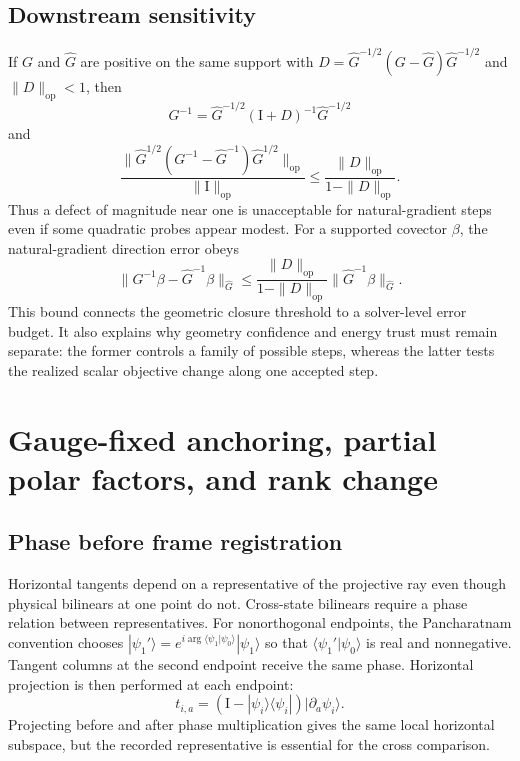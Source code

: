 \documentclass[10pt,twocolumn]{article}
\theoremstyle{definition}
\theoremstyle{remark}
\newcommand{\Id}{\mathrm I}
\newcommand{\op}{\mathrm{op}}
\begin{document}
\subsection{Downstream sensitivity}

If $G$ and $\widehat G$ are positive on the same support with
$D=\widehat G^{-1/2}(G-\widehat G)\widehat G^{-1/2}$ and
$\|D\|_{\op}<1$, then
\begin{equation}
 G^{-1}
 =\widehat G^{-1/2}(\Id+D)^{-1}\widehat G^{-1/2}
 \label{eq:appinverseidentity}
\end{equation}
and
\begin{equation}
 \frac{\|\widehat G^{1/2}(G^{-1}-\widehat G^{-1})
 \widehat G^{1/2}\|_{\op}}
 {\|\Id\|_{\op}}
 \le\frac{\|D\|_{\op}}{1-\|D\|_{\op}} .
 \label{eq:appinversebound}
\end{equation}
Thus a defect of magnitude near one is unacceptable for natural-gradient
steps even if some quadratic probes appear modest.  For a supported covector
$\beta$, the natural-gradient direction error obeys
\begin{equation}
 \|G^{-1}\beta-\widehat G^{-1}\beta\|_{\widehat G}
 \le
 \frac{\|D\|_{\op}}{1-\|D\|_{\op}}
 \|\widehat G^{-1}\beta\|_{\widehat G}.
 \label{eq:appstepbound}
\end{equation}
This bound connects the geometric closure threshold to a solver-level error
budget.  It also explains why geometry confidence and energy trust must remain
separate: the former controls a family of possible steps, whereas the latter
tests the realized scalar objective change along one accepted step.

\section{Gauge-fixed anchoring, partial polar factors, and rank change}
\label{app:anchordetails}

\subsection{Phase before frame registration}

Horizontal tangents depend on a representative of the projective ray even
though physical bilinears at one point do not.  Cross-state bilinears require
a phase relation between representatives.  For nonorthogonal endpoints, the
Pancharatnam convention chooses
$|\psi_1'\rangle=e^{i\arg\langle\psi_1|\psi_0\rangle}|\psi_1\rangle$ so that
$\langle\psi_1'|\psi_0\rangle$ is real and nonnegative.  Tangent columns at
the second endpoint receive the same phase.  Horizontal projection is then
performed at each endpoint:
\begin{equation}
 t_{i,a}=(\Id-|\psi_i\rangle\langle\psi_i|)
 |\partial_a\psi_i\rangle .
 \label{eq:appanchorhorizontal}
\end{equation}
Projecting before and after phase multiplication gives the same local
horizontal subspace, but the recorded representative is essential for the
cross comparison.
\end{document}
